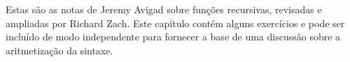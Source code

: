\documentclass[../../../include/open-logic-chapter]{subfiles}
\begin{document}

\begin{editorial}
  Estas são as notas de Jeremy Avigad sobre funções recursivas, revisadas e
  ampliadas por Richard Zach. Este capítulo contém alguns exercícios e pode
  ser incluído de modo independente para fornecer a base de uma discussão
  sobre a aritmetização da sintaxe.
\end{editorial}





















\OLEndChapterHook
\end{document}
